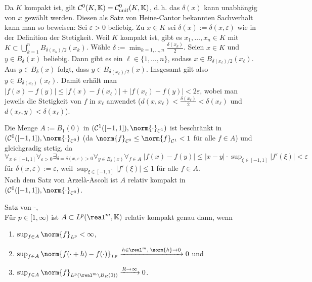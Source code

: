 \begin{Bem}
    Da $K$ kompakt ist, gilt $\mathcal{C}^0(K, \mathbb{K}) = \mathcal{C}^0_{\text{unif}}(K, \mathbb{K})$,
    d.\,h. das $\delta(x)$ kann unabhängig von $x$ gewählt werden.
    Diesen als Satz von Heine-Cantor bekannten Sachverhalt kann man so beweisen:
    Sei $\varepsilon > 0$ beliebig.
    Zu $x \in K$ sei $\delta(x) := \delta(x, \varepsilon)$ wie in der Definition der Stetigkeit.
    Weil $K$ kompakt ist, gibt es $x_1, \dotsc, x_n \in K$ mit
    $K \subset \bigcup_{k=1}^n B_{\delta(x_k)/2}(x_k)$.
    Wähle $\delta := \min_{k=1,\dotsc,n} \frac{\delta(x_k)}{2}$.
    Seien $x \in K$ und $y \in B_\delta(x)$ beliebig.
    Dann gibt es ein $\ell \in \{1, \dotsc, n\}$, sodass
    $x \in B_{\delta(x_\ell)/2}(x_\ell)$.
    Aus $y \in B_\delta(x)$ folgt, dass $y \in B_{\delta(x_\ell)/2}(x)$.
    Insgesamt gilt also $y \in B_{\delta(x_\ell)}(x_\ell)$.
    Damit erhält man
    $|f(x) - f(y)| \le |f(x) - f(x_\ell)| + |f(x_\ell) - f(y)| < 2\varepsilon$,
    wobei man jeweils die Stetigkeit von $f$ in $x_\ell$ anwendet
    ($d(x, x_\ell) < \frac{\delta(x_\ell)}{2} < \delta(x_\ell)$ und
    $d(x_\ell, y) < \delta(x_\ell)$).
\end{Bem}

\begin{Bsp}
    Die Menge $A := B_1(0)$ in $(\C^1([-1, 1]), \norm{\cdot}_{\C^1})$
    ist beschränkt in $(\C^0([-1, 1]), \norm{\cdot}_{\C^0})$
    (da $\norm{f}_{\C^0} \le \norm{f}_{\C^1} < 1$ für alle $f \in A$)
    und gleichgradig stetig, da\\
    $\forall_{x \in [-1, 1]} \forall_{\varepsilon > 0}
    \exists_{\delta = \delta(x, \varepsilon) > 0} \forall_{y \in B_\delta(x)}
    \forall_{f \in A}\; |f(x) - f(y)| \le |x - y| \cdot
    \sup_{\xi \in [-1, 1]} |f'(\xi)| < \varepsilon$
    für $\delta(x, \varepsilon) := \varepsilon$,
    weil $\sup_{\xi \in [-1, 1]} |f'(\xi)| \le 1$ für alle $f \in A$.\\
    Nach dem Satz von Arzelà-Ascoli ist $A$ relativ kompakt in
    $(\C^0([-1, 1]), \norm{\cdot}_{\C^0})$.
\end{Bsp}

\begin{Satz}{Satz von -, }\\
    Für $p \in [1, \infty)$ ist $A \subset L^p(\real^m, \KK)$ relativ kompakt genau dann, wenn
    \begin{enumerate}
        \item
        $\sup_{f \in A} \norm{f}_{L^p} < \infty$,

        \item
        $\sup_{f \in A} \norm{f(\cdot + h) - f(\cdot)}_{L^p}
        \xrightarrow{h \in \real^m,\; \norm{h} \to 0} 0$ und

        \item
        $\sup_{f \in A} \norm{f}_{L^p(\real^m \setminus B_R(0))}
        \xrightarrow{R \to \infty} 0$.
    \end{enumerate}
\end{Satz}

\pagebreak
